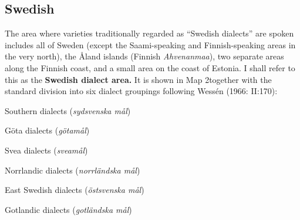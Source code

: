 \subsection{\rmfamily Swedish}
\label{bkm:Ref108607742}
\begin{styleBodyTextFirst}
The area where varieties traditionally regarded as “Swedish dialects” are spoken includes all of Sweden (except the Saami-speaking and Finnish-speaking areas in the very north), the Åland islands (Finnish \textit{Ahvenanmaa}), two separate areas along the Finnish coast, and a small area on the coast of Estonia. I shall refer to this as the \textbf{Swedish dialect area.} It is shown in Map 2together with the standard division into six dialect groupings following Wessén (1966: II:170): 

\end{styleBodyTextFirst}


\begin{listWWNumiiileveli}
\item 

\begin{styleListii}
Southern dialects (\textit{sydsvenska mål})

\end{styleListii}

\item 

\begin{styleListii}
Göta dialects (\textit{götamål})

\end{styleListii}

\item 

\begin{styleListii}
Svea dialects (\textit{sveamål})

\end{styleListii}

\item 

\begin{styleListii}
Norrlandic dialects (\textit{norrländska mål})

\end{styleListii}

\item 

\begin{styleListii}
East Swedish dialects (\textit{östsvenska mål})

\end{styleListii}

\item 

\begin{styleListii}
Gotlandic dialects (\textit{gotländska mål})

\end{styleListii}

\end{listWWNumiiileveli}

